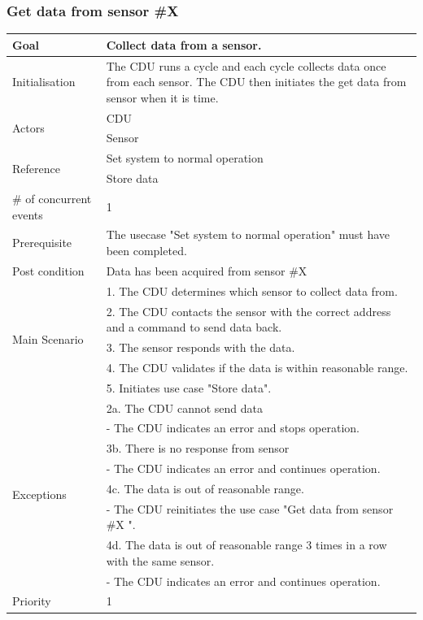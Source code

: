 \subsubsection{Get data from sensor \#X}
\begin{table}[H]
	\centering
	\begin{tabular}{|l|p{10cm}|}
	\hline
	Goal 							& Collect data from a sensor. \\ \hline
	Initialisation 					& The CDU runs a cycle and each cycle collects data once from each sensor. The CDU then initiates the get data from sensor when it is time. \\ \hline
	\multirow{2}{*}{Actors} 		& CDU \\ 
									& Sensor \\ \hline
	\multirow{2}{*}{Reference}		& Set system to normal operation \\ 
									& Store data \\\hline
	\# of concurrent events 		& 1 \\ \hline
	Prerequisite  					& The usecase "Set system to normal operation" must have been completed. \\ \hline
	Post condition 					& Data has been acquired from sensor \#X \\ \hline
	\multirow{5}{*}{Main Scenario} 	& 1. The CDU determines which sensor to collect data from. \\
	& 2. The CDU contacts the sensor with the correct address  and a command to send data back.\\
	& 3. The sensor responds with the data.\\ 
	& 4. The CDU validates if the data is within reasonable range. \\
	& 5. Initiates use case "Store data".\\ \hline
	\multirow{8}{*}{Exceptions} & 2a. The CDU cannot send data \\ 
								& - The CDU indicates an error and stops operation.\\											& 3b. There is no response from sensor\\
								& - The CDU indicates an error and continues operation. \\
								& 4c. The data is out of reasonable range.\\
								& - The CDU reinitiates the use case "Get data from sensor \#X ". \\ 
								& 4d. The data is out of reasonable range 3 times in a row with the same sensor. \\
								& - The CDU indicates an error and continues operation.\\ \hline
	Priority					& 1\\\hline
	\end{tabular}
\end{table}

